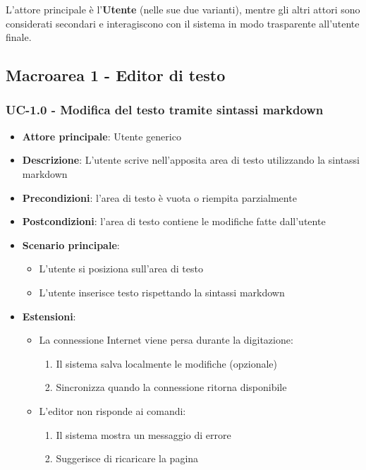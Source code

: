 \documentclass[11pt,a4paper]{article}
\begin{document}
L'attore principale è l'\textbf{Utente} (nelle sue due varianti), mentre gli altri attori sono considerati secondari e interagiscono con il sistema in modo trasparente all'utente finale.

\newpage

\subsection{Macroarea 1 - Editor di testo}
\subsubsection{UC-1.0 - Modifica del testo tramite sintassi markdown}
\begin{itemize}
    \item \textbf{Attore principale}: Utente generico
    \item \textbf{Descrizione}: L’utente scrive nell’apposita area di testo utilizzando la sintassi markdown
    \item \textbf{Precondizioni}: l’area di testo è vuota o riempita parzialmente
    \item \textbf{Postcondizioni}: l’area di testo contiene le modifiche fatte dall’utente
    \item \textbf{Scenario principale}:
        \begin{itemize}
            \item L’utente si posiziona sull’area di testo
            \item L’utente inserisce testo rispettando la sintassi markdown
        \end{itemize}
    \item \textbf{Estensioni}:
        \begin{itemize}
            \item La connessione Internet viene persa durante la digitazione:
                \begin{enumerate}
                    \item Il sistema salva localmente le modifiche (opzionale)
                    \item Sincronizza quando la connessione ritorna disponibile
                \end{enumerate}
            \item L'editor non risponde ai comandi:
                \begin{enumerate}
                    \item Il sistema mostra un messaggio di errore
                    \item Suggerisce di ricaricare la pagina
                \end{enumerate}
        \end{itemize}
\end{itemize}
\end{document}
